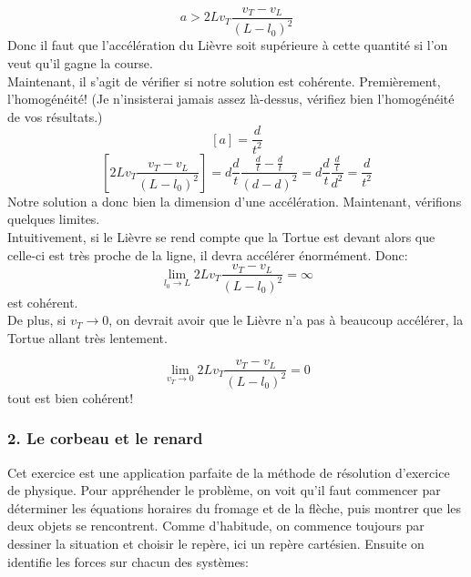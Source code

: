 \documentclass[a4paper,10pt,twoside]{article}
\begin{document}
\[ a>2 L v_T\dfrac{v_T-v_L}{(L-l_0)^2}\]
Donc il faut que l'accélération du Lièvre soit supérieure à cette quantité si l'on veut qu'il gagne la course. \\
Maintenant, il s'agit de vérifier si notre solution est cohérente. Premièrement, l'homogénéité! (Je n'insisterai jamais assez là-dessus, vérifiez bien l'homogénéité de vos résultats.)
\[ [a]=\dfrac{d}{t^2}\]
\[ [2 L v_T\dfrac{v_T-v_L}{(L-l_0)^2}]= d \frac{d}{t} \dfrac{\frac{d}{t}-\frac{d}{t}}{(d-d)^2}= d \frac{d}{t} \dfrac{\frac{d}{t}}{d^2}=\dfrac{d}{t^2}\]
Notre solution a donc bien la dimension d'une accélération. Maintenant, vérifions quelques limites. \\ 
Intuitivement, si le Lièvre se rend compte que la Tortue est devant alors que celle-ci est très proche de la ligne, il devra accélérer énormément. Donc:
\[ \lim_{l_0 \to L}{2 L v_T\dfrac{v_T-v_L}{(L-l_0)^2}}=\infty\] est cohérent.\\
De plus, si $v_T \to 0$, on devrait avoir que le Lièvre n'a pas à beaucoup accélérer, la Tortue allant très lentement. 

\[ \lim_{v_T \to 0}{2 L v_T\dfrac{v_T-v_L}{(L-l_0)^2}}=0\] tout est bien cohérent!

\newpage

\subsubsection*{2. Le corbeau et le renard}
Cet exercice est une application parfaite de la méthode de résolution d'exercice de physique.
Pour appréhender le problème, on voit qu'il faut commencer par déterminer les équations horaires du fromage et de la flèche, puis montrer que les deux objets se rencontrent.
Comme d'habitude, on commence toujours par dessiner la situation et choisir le repère, ici un repère cartésien.
Ensuite on identifie les forces sur chacun des systèmes:
\end{document}
